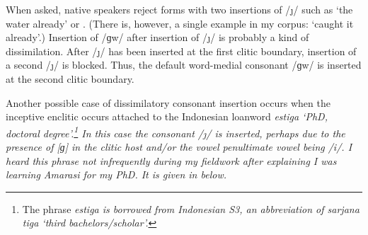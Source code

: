 \begin{exe}
\end{exe}

When asked, native speakers reject forms with two insertions of /\j/ such as
 `the water already' or .
(There is, however, a single example in my corpus:  `caught it already'.)
Insertion of /ɡw/ after insertion of /\j/ is probably a kind of dissimilation.
After /\j/ has been inserted at the first clitic boundary,
insertion of a second /\j/ is blocked.
Thus, the default word-medial consonant /ɡw/
is inserted at the second clitic boundary.

Another possible case of dissimilatory consonant insertion occurs
when the inceptive enclitic  occurs attached to the Indonesian loanword \it{estiga} `PhD, doctoral degree'.\footnote{
		The phrase \it{estiga} is borrowed from Indonesian S3, an abbreviation of \it{sarjana tiga} `third bachelors/scholar'.}
In this case the consonant /\j/ is inserted,
perhaps due to the presence of [ɡ] in the clitic host
and/or the vowel penultimate vowel being /i/.
I heard this phrase not infrequently during my fieldwork
after explaining I was learning Amarasi for my PhD.
It is given in  below.

\begin{exe}
	\label{ex:estiga=jen}
\end{exe}


